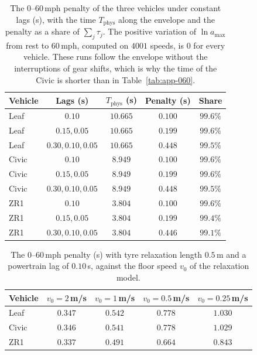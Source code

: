 \documentclass[12pt, twoside]{amsart}
\theoremstyle{definition}
\newcommand{\amax}{a_{\max}}
\begin{document}
\begin{table}[htbp]
\centering\small
\caption{The $0$--$60$\,mph penalty of the three vehicles under constant lags (s), with the time $T_{\mathrm{phys}}$ along the envelope and the penalty as a share of $\sum_j\tau_j$. The positive variation of $\ln\amax$ from rest to $60$\,mph, computed on $4001$ speeds, is $0$ for every vehicle. These runs follow the envelope without the interruptions of gear shifts, which is why the time of the Civic is shorter than in Table~\ref{tab:app-060}.}\label{tab:app-transient-veh}
\begin{tabular}{lcccc}
\toprule
Vehicle & Lags (s) & $T_{\mathrm{phys}}$ (s) & Penalty (s) & Share\\
\midrule
Leaf & $0.10$ & $10.665$ & $0.100$ & $99.6\%$\\
Leaf & $0.15, 0.05$ & $10.665$ & $0.199$ & $99.6\%$\\
Leaf & $0.30, 0.10, 0.05$ & $10.665$ & $0.448$ & $99.5\%$\\
Civic & $0.10$ & $8.949$ & $0.100$ & $99.6\%$\\
Civic & $0.15, 0.05$ & $8.949$ & $0.199$ & $99.6\%$\\
Civic & $0.30, 0.10, 0.05$ & $8.949$ & $0.448$ & $99.5\%$\\
ZR1 & $0.10$ & $3.804$ & $0.100$ & $99.6\%$\\
ZR1 & $0.15, 0.05$ & $3.804$ & $0.199$ & $99.4\%$\\
ZR1 & $0.30, 0.10, 0.05$ & $3.804$ & $0.446$ & $99.1\%$\\
\bottomrule
\end{tabular}
\end{table}

\begin{table}[htbp]
\centering\small
\caption{The $0$--$60$\,mph penalty (s) with tyre relaxation length $0.5$\,m and a powertrain lag of $0.10$\,s, against the floor speed $v_0$ of the relaxation model.}\label{tab:app-relax}
\begin{tabular}{lcccc}
\toprule
Vehicle & $v_0=2$\,m/s & $v_0=1$\,m/s & $v_0=0.5$\,m/s & $v_0=0.25$\,m/s\\
\midrule
Leaf & $0.347$ & $0.542$ & $0.778$ & $1.030$\\
Civic & $0.346$ & $0.541$ & $0.778$ & $1.029$\\
ZR1 & $0.337$ & $0.491$ & $0.664$ & $0.843$\\
\bottomrule
\end{tabular}
\end{table}
\FloatBarrier
\end{document}
